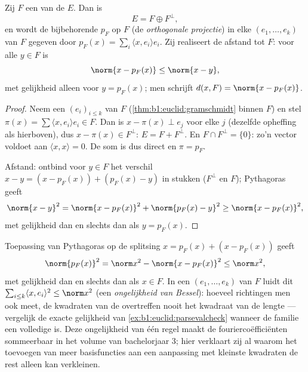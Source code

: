 \begin{theorem}\label{thm:b1:euclid:projection}
Zij $F$ een  van de  $E$. Dan is
\[
E = F \oplus F^{\perp},
\]
en wordt de bijbehorende  $p_F$ op $F$ (de
\emph{orthogonale projectie}) in elke
  $(e_1, \dots, e_k)$ van $F$ gegeven door $p_F(x)
= \sum_i \langle x, e_i\rangle e_i$. Zij realiseert de afstand tot
$F$: voor alle $y \in F$ is
\[
\norm{x - p_F(x)} \leq \norm{x - y},
\]
met gelijkheid alleen voor $y = p_F(x)$; men schrijft $d(x, F) =
\norm{x - p_F(x)}$.
\end{theorem}

\begin{proof}
Neem een   $(e_i)_{i \leq k}$ van $F$
(\cref{thm:b1:euclid:gramschmidt} binnen $F$) en stel $\pi(x) =
\sum \langle x, e_i\rangle e_i \in F$. Dan is $x - \pi(x) \perp
e_j$ voor elke $j$ (dezelfde opheffing als hierboven), dus $x -
\pi(x) \in F^\perp$: $E = F + F^\perp$. En $F \cap F^\perp =
\{0\}$: zo'n vector voldoet aan $\langle x, x\rangle = 0$. De som
is dus direct en $\pi = p_F$.

Afstand: ontbind voor $y \in F$ het verschil $x - y = (x - p_F(x)) +
(p_F(x) - y)$ in  stukken ($F^\perp$ en $F$); Pythagoras
geeft
\[
\norm{x - y}^2 = \norm{x - p_F(x)}^2 + \norm{p_F(x) - y}^2
\geq \norm{x - p_F(x)}^2,
\]
met gelijkheid dan en slechts dan als $y = p_F(x)$.
\end{proof}

\begin{example}
\label{ex:b1:euclid:bessel}
Toepassing van Pythagoras op de splitsing $x = p_F(x) + (x -
p_F(x))$ geeft
\[
\norm{p_F(x)}^2 = \norm x^2 - \norm{x - p_F(x)}^2 \leq
\norm x^2 ,
\]
met gelijkheid dan en slechts dan als $x \in F$. In een
  $(e_1, \dots, e_k)$ van $F$ luidt dit $\sum_{i
\leq k}\langle x, e_i\rangle^2 \leq \norm x^2$ (een
\emph{ongelijkheid van Bessel}): hoeveel  richtingen
men ook meet, de kwadraten van de  overtreffen nooit het
kwadraat van de lengte --- vergelijk de exacte gelijkheid van
\cref{ex:b1:euclid:parsevalcheck} wanneer de familie een volledige
 is. Deze ongelijkheid van één regel maakt de
fouriercoëfficiënten sommeerbaar in het volume van bachelorjaar 3;
hier verklaart zij al waarom het toevoegen van meer basisfuncties
aan een aanpassing met kleinste kwadraten de rest alleen kan
verkleinen.
\end{example}

